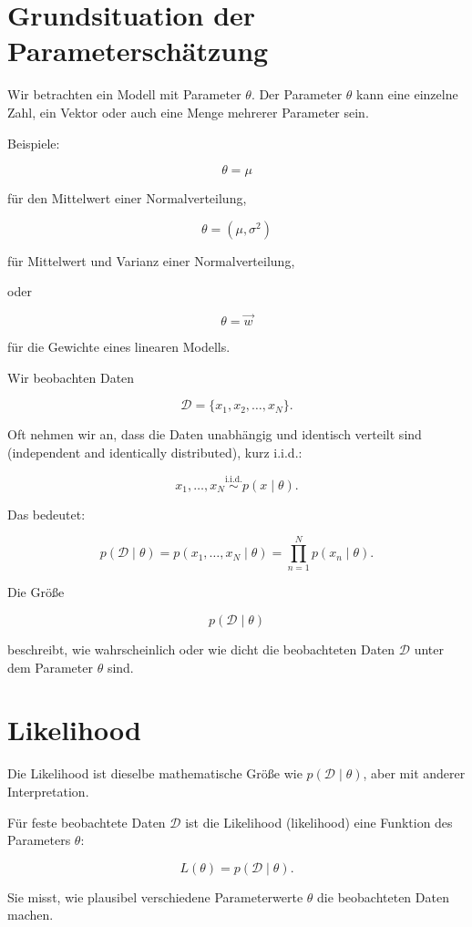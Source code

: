 \section{Grundsituation der Parameterschätzung}

Wir betrachten ein Modell mit Parameter \(\theta\).
Der Parameter \(\theta\) kann eine einzelne Zahl, ein Vektor oder auch eine Menge mehrerer Parameter sein.

Beispiele:

\[
    \theta = \mu
\]

für den Mittelwert einer Normalverteilung,

\[
    \theta = (\mu,\sigma^2)
\]

für Mittelwert und Varianz einer Normalverteilung,

oder

\[
    \theta = \vec{w}
\]

für die Gewichte eines linearen Modells.

Wir beobachten Daten

\[
    \mathcal{D}
    =
    \{x_1,x_2,\dots,x_N\}.
\]

Oft nehmen wir an, dass die Daten unabhängig und identisch verteilt sind (independent and identically distributed), kurz i.i.d.:

\[
    x_1,\dots,x_N
    \overset{\mathrm{i.i.d.}}{\sim}
    p(x \mid \theta).
\]

Das bedeutet:

\[
    p(\mathcal{D} \mid \theta)
    =
    p(x_1,\dots,x_N \mid \theta)
    =
    \prod_{n=1}^{N}
    p(x_n \mid \theta).
\]

\begin{definitionbox}
Die Größe

\[
    p(\mathcal{D} \mid \theta)
\]

beschreibt, wie wahrscheinlich oder wie dicht die beobachteten Daten \(\mathcal{D}\) unter dem Parameter \(\theta\) sind.
\end{definitionbox}

\section{Likelihood}

Die Likelihood ist dieselbe mathematische Größe wie \(p(\mathcal{D} \mid \theta)\), aber mit anderer Interpretation.

\begin{definitionbox}
Für feste beobachtete Daten \(\mathcal{D}\) ist die Likelihood (likelihood) eine Funktion des Parameters \(\theta\):

\[
    L(\theta)
    =
    p(\mathcal{D} \mid \theta).
\]

Sie misst, wie plausibel verschiedene Parameterwerte \(\theta\) die beobachteten Daten machen.
\end{definitionbox}

